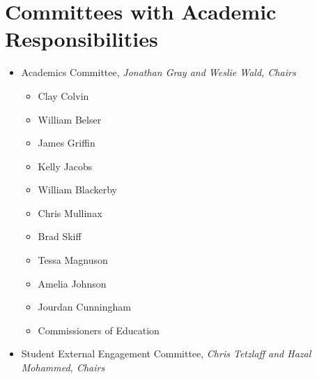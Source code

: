 \section{Committees with Academic Responsibilities}
\begin{itemize}\itemsep=0mm
  \item[] Academics Committee, \emph{Jonathan Gray and Weslie Wald, Chairs}
\begin{itemize}\itemsep=0mm
  \item[] Clay Colvin
  \item[] William Belser
  \item[] James Griffin
  \item[] Kelly Jacobs
  \item[] William Blackerby
  \item[] Chris Mullinax 
  \item[] Brad Skiff 
  \item[] Tessa Magnuson    
  \item[] Amelia Johnson             
  \item[] Jourdan Cunningham
  \item[] Commissioners of Education
\end{itemize}\etc
  \item[] Student External Engagement Committee, \emph{Chris Tetzlaff and Hazal Mohammed, Chairs}
\end{itemize}
\newpage




